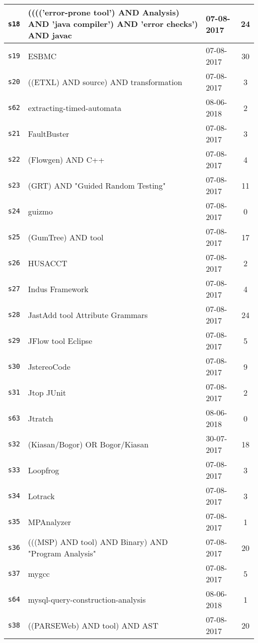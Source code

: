 \begin{longtable}{| l | p{13cm} | l | c |}
    \hline
\texttt{s18} & (((('error-prone tool') AND Analysis) AND 'java compiler') AND 'error checks') AND javac & 07-08-2017 & 24 \\
    \hline
\texttt{s19} & ESBMC & 07-08-2017 & 30 \\
    \hline
\texttt{s20} & ((ETXL) AND source) AND transformation & 07-08-2017 & 3 \\
    \hline
\texttt{s62} & extracting-timed-automata & 08-06-2018 & 2 \\
    \hline
\texttt{s21} & FaultBuster & 07-08-2017 & 3 \\
    \hline
\texttt{s22} & (Flowgen) AND C++ & 07-08-2017 & 4 \\
    \hline
\texttt{s23} & (GRT) AND "Guided Random Testing" & 07-08-2017 & 11 \\
    \hline
\texttt{s24} & guizmo & 07-08-2017 & 0 \\
    \hline
\texttt{s25} & (GumTree) AND tool & 07-08-2017 & 17 \\
    \hline
\texttt{s26} & HUSACCT & 07-08-2017 & 2 \\
    \hline
\texttt{s27} & Indus Framework & 07-08-2017 & 4 \\
    \hline
\texttt{s28} & JastAdd tool Attribute Grammars & 07-08-2017 & 24 \\
    \hline
\texttt{s29} & JFlow tool Eclipse & 07-08-2017 & 5 \\
    \hline
\texttt{s30} & JstereoCode & 07-08-2017 & 9 \\
    \hline
\texttt{s31} & Jtop JUnit & 07-08-2017 & 2 \\
    \hline
\texttt{s63} & Jtratch & 08-06-2018 & 0 \\
    \hline
\texttt{s32} & (Kiasan/Bogor) OR Bogor/Kiasan & 30-07-2017 & 18 \\
    \hline
\texttt{s33} & Loopfrog & 07-08-2017 & 3 \\
    \hline
\texttt{s34} & Lotrack & 07-08-2017 & 3 \\
    \hline
\texttt{s35} & MPAnalyzer & 07-08-2017 & 1 \\
    \hline
\texttt{s36} & (((MSP) AND tool) AND Binary) AND "Program Analysis" & 07-08-2017 & 20 \\
    \hline
\texttt{s37} & mygcc & 07-08-2017 & 5 \\
    \hline
\texttt{s64} & mysql-query-construction-analysis & 08-06-2018 & 1 \\
    \hline
\texttt{s38} & ((PARSEWeb) AND tool) AND AST & 07-08-2017 & 20 \\

\end{longtable}
